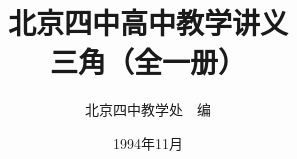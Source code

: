 \documentclass[b5paper, openany]{ctexbook}
\theoremstyle{plain}
\begin{document}
\title{\Huge\bfseries 北京四中高中教学讲义\\三角（全一册）}



\author{\Large 北京四中教学处~~编}
\date{\Large 1994年11月}

\maketitle




\frontmatter


\tableofcontents


\mainmatter

 

 
 
 
 
\backmatter
\end{document}
